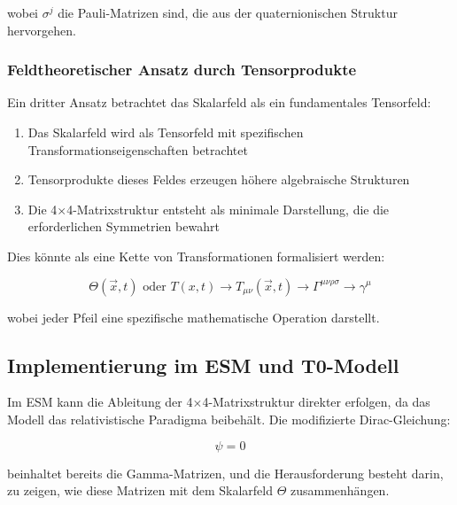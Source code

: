 \documentclass[12pt,a4paper]{article}
\newcommand{\Tfieldt}{T(x,t)}
\newcommand{\vecx}{\vec{x}}
\begin{document}
	wobei $\sigma^j$ die Pauli-Matrizen sind, die aus der quaternionischen Struktur hervorgehen.
	
	\subsubsection{Feldtheoretischer Ansatz durch Tensorprodukte}
	\label{subsubsec:tensor_approach}
	
	Ein dritter Ansatz betrachtet das Skalarfeld als ein fundamentales Tensorfeld:
	
	\begin{enumerate}
		\item Das Skalarfeld wird als Tensorfeld mit spezifischen Transformationseigenschaften betrachtet
		\item Tensorprodukte dieses Feldes erzeugen höhere algebraische Strukturen
		\item Die 4$\times$4-Matrixstruktur entsteht als minimale Darstellung, die die erforderlichen Symmetrien bewahrt
	\end{enumerate}
	
	Dies könnte als eine Kette von Transformationen formalisiert werden:
	
	\begin{equation}
		\Theta(\vecx,t) \text{ oder } \Tfieldt \rightarrow T_{\mu\nu}(\vecx,t) \rightarrow \Gamma^{\mu\nu\rho\sigma} \rightarrow \gamma^{\mu}
		\label{eq:tensor_chain}
	\end{equation}
	
	wobei jeder Pfeil eine spezifische mathematische Operation darstellt.
	
	\subsection{Implementierung im ESM und T0-Modell}
	\label{subsec:implementation}
	
	Im ESM kann die Ableitung der 4$\times$4-Matrixstruktur direkter erfolgen, da das Modell das relativistische Paradigma beibehält. Die modifizierte Dirac-Gleichung:
	
	\begin{equation}
		[i\gamma^{\mu}(\partial_{\mu} + \partial_{\mu}\Theta) - m]\psi = 0
		\label{eq:esm_dirac}
	\end{equation}
	
	beinhaltet bereits die Gamma-Matrizen, und die Herausforderung besteht darin, zu zeigen, wie diese Matrizen mit dem Skalarfeld $\Theta$ zusammenhängen.
	
\end{document}
